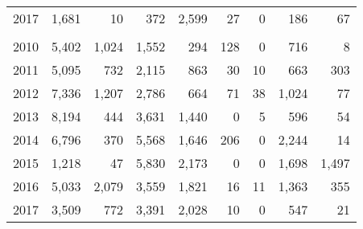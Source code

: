 \documentclass[]{article}
\begin{document}
\begin{table}
\begin{tabular}[t]{lrrrrrrrr}
\hspace{1em}\hspace{1em}\hspace{1em}\hspace{1em}2017 & 1,681 & 10 & 372 & 2,599 & 27 & 0 & 186 & 67\\
\addlinespace[0.3em]
\multicolumn{9}{l}{\textbf{Cape Simpson}}\\
\hspace{1em}\hspace{1em}\hspace{1em}\hspace{1em}2010 & 5,402 & 1,024 & 1,552 & 294 & 128 & 0 & 716 & 8\\
\hspace{1em}\hspace{1em}\hspace{1em}\hspace{1em}2011 & 5,095 & 732 & 2,115 & 863 & 30 & 10 & 663 & 303\\
\hspace{1em}\hspace{1em}\hspace{1em}\hspace{1em}2012 & 7,336 & 1,207 & 2,786 & 664 & 71 & 38 & 1,024 & 77\\
\hspace{1em}\hspace{1em}\hspace{1em}\hspace{1em}2013 & 8,194 & 444 & 3,631 & 1,440 & 0 & 5 & 596 & 54\\
\hspace{1em}\hspace{1em}\hspace{1em}\hspace{1em}2014 & 6,796 & 370 & 5,568 & 1,646 & 206 & 0 & 2,244 & 14\\
\hspace{1em}\hspace{1em}\hspace{1em}\hspace{1em}2015 & 1,218 & 47 & 5,830 & 2,173 & 0 & 0 & 1,698 & 1,497\\
\hspace{1em}\hspace{1em}\hspace{1em}\hspace{1em}2016 & 5,033 & 2,079 & 3,559 & 1,821 & 16 & 11 & 1,363 & 355\\
\hspace{1em}\hspace{1em}\hspace{1em}\hspace{1em}2017 & 3,509 & 772 & 3,391 & 2,028 & 10 & 0 & 547 & 21\\
\bottomrule
\end{tabular}
\end{table}
\end{document}
